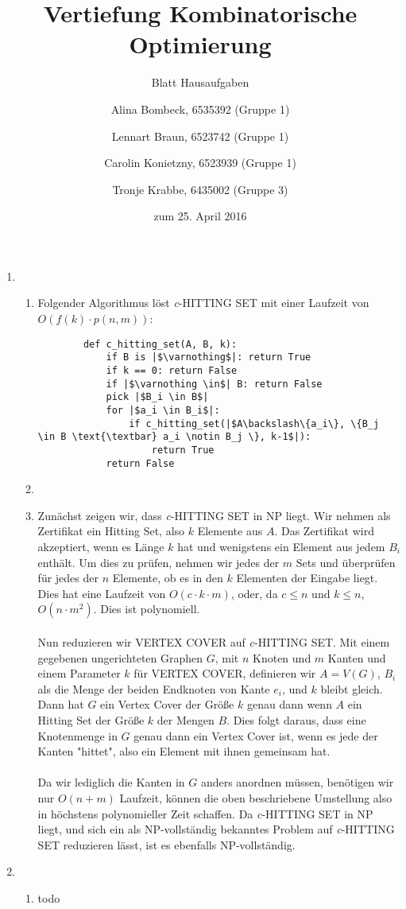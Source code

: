 \documentclass[a4paper]{scrartcl}
\title{Vertiefung Kombinatorische Optimierung}
\subtitle{Blatt {\blattnr} Hausaufgaben}
\author{%
    Alina Bombeck, 6535392 (Gruppe 1) \and
    Lennart Braun, 6523742 (Gruppe 1) \and
    Carolin Konietzny, 6523939 (Gruppe 1) \and
    Tronje Krabbe, 6435002 (Gruppe 3)
}
\date{zum 25. April 2016}
\begin{document}
\maketitle


\begin{enumerate}[label=\bfseries \arabic*.]
\item %
\begin{enumerate}
    \item %
        Folgender Algorithmus löst \textit{c}-HITTING SET mit einer Laufzeit von \\
        $O(f(k) \cdot p(n, m))$:
        \begin{verbatim}
        def c_hitting_set(A, B, k):
            if B is |$\varnothing$|: return True
            if k == 0: return False
            if |$\varnothing \in$| B: return False
            pick |$B_i \in B$|
            for |$a_i \in B_i$|:
                if c_hitting_set(|$A\backslash\{a_i\}, \{B_j \in B \text{\textbar} a_i \notin B_j \}, k-1$|):
                    return True
            return False
        \end{verbatim}

    \item %

    \item %
        Zunächst zeigen wir, dass \textit{c}-HITTING SET in NP liegt.
        Wir nehmen als Zertifikat ein Hitting Set, also $k$ Elemente aus $A$.
        Das Zertifikat wird akzeptiert, wenn es Länge $k$ hat und wenigstens ein
        Element aus jedem $B_i$ enthält. Um dies zu prüfen, nehmen wir jedes der
        $m$ Sets und überprüfen für jedes der $n$ Elemente, ob es in den $k$ Elementen
        der Eingabe liegt. Dies hat eine Laufzeit von $O(c \cdot k \cdot m)$, oder,
        da $c \leq n$ und $k \leq n$, $O(n \cdot m^2)$. Dies ist polynomiell.
        \\
        \\
        Nun reduzieren wir VERTEX COVER auf \textit{c}-HITTING SET.
        Mit einem gegebenen ungerichteten Graphen $G$, mit $n$ Knoten und $m$ Kanten
        und einem Parameter $k$ für VERTEX COVER, definieren wir $A = V(G)$, $B_i$
        als die Menge der beiden Endknoten von Kante $e_i$, und $k$ bleibt gleich.
        Dann hat $G$ ein Vertex Cover der Größe $k$ genau dann wenn $A$ ein
        Hitting Set der Größe $k$ der Mengen $B$. Dies folgt daraus, dass
        eine Knotenmenge in $G$ genau dann ein Vertex Cover ist, wenn
        es jede der Kanten "hittet", also ein Element mit ihnen gemeinsam hat.
        \\
        \\
        Da wir lediglich die Kanten in $G$ anders anordnen müssen, benötigen
        wir nur $O(n + m)$ Laufzeit, können die oben beschriebene Umstellung also
        in höchstens polynomieller Zeit schaffen. Da \textit{c}-HITTING SET
        in NP liegt, und sich ein als NP-vollständig bekanntes Problem auf
        \textit{c}-HITTING SET reduzieren lässt, ist es ebenfalls NP-vollständig.
\end{enumerate}

\item %
\begin{enumerate}
    \item todo
\end{enumerate}
\end{enumerate}
\end{document}

